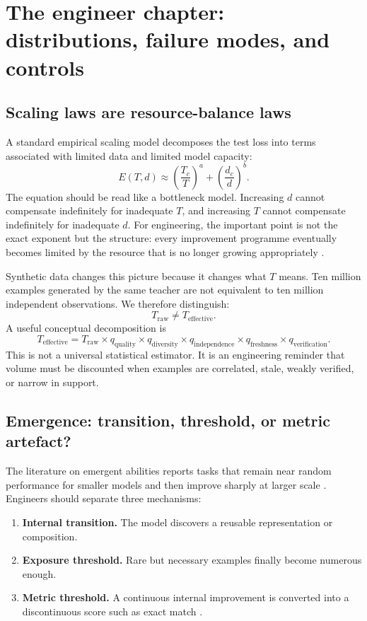 \section{The engineer chapter: distributions, failure modes, and controls}

\subsection{Scaling laws are resource-balance laws}

A standard empirical scaling model decomposes the test loss into terms associated with limited data and limited model capacity:
\[
E(T,d) \approx \left(\frac{T_c}{T}\right)^a + \left(\frac{d_c}{d}\right)^b.
\]
The equation should be read like a bottleneck model. Increasing $d$ cannot compensate indefinitely for inadequate $T$, and increasing $T$ cannot compensate indefinitely for inadequate $d$. For engineering, the important point is not the exact exponent but the structure: every improvement programme eventually becomes limited by the resource that is no longer growing appropriately \citep{kaplan2020scaling,hoffmann2022chinchilla}.

Synthetic data changes this picture because it changes what $T$ means. Ten million examples generated by the same teacher are not equivalent to ten million independent observations. We therefore distinguish:
\[
T_{\mathrm{raw}} \neq T_{\mathrm{effective}}.
\]
A useful conceptual decomposition is
\[
T_{\mathrm{effective}}
= T_{\mathrm{raw}}
\times q_{\mathrm{quality}}
\times q_{\mathrm{diversity}}
\times q_{\mathrm{independence}}
\times q_{\mathrm{freshness}}
\times q_{\mathrm{verification}}.
\]
This is not a universal statistical estimator. It is an engineering reminder that volume must be discounted when examples are correlated, stale, weakly verified, or narrow in support.

\subsection{Emergence: transition, threshold, or metric artefact?}

The literature on emergent abilities reports tasks that remain near random performance for smaller models and then improve sharply at larger scale \citep{wei2022emergent}. Engineers should separate three mechanisms:

\begin{enumerate}[leftmargin=*]
  \item \textbf{Internal transition.} The model discovers a reusable representation or composition.
  \item \textbf{Exposure threshold.} Rare but necessary examples finally become numerous enough.
  \item \textbf{Metric threshold.} A continuous internal improvement is converted into a discontinuous score such as exact match \citep{schaeffer2023mirage}.
\end{enumerate}

